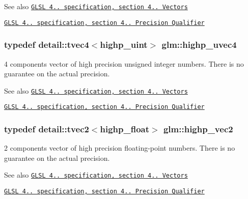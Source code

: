 \begin{DoxySeeAlso}{See also}
\href{http://www.opengl.org/registry/doc/GLSLangSpec.4.20.8.pdf}{\tt G\+L\+S\+L 4.. specification, section 4.. Vectors} 

\href{http://www.opengl.org/registry/doc/GLSLangSpec.4.20.8.pdf}{\tt G\+L\+S\+L 4.. specification, section 4.. Precision Qualifier} 
\end{DoxySeeAlso}
\hypertarget{group__core__precision_gadc25684638be5d1caeb63d3d5e55feec}{}
\subsubsection[{highp\+\_\+uvec4}]{\setlength{\rightskip}{0pt plus 5cm}typedef detail\+::tvec4$<$highp\+\_\+uint$>$ {\bf glm\+::highp\+\_\+uvec4}}\label{group__core__precision_gadc25684638be5d1caeb63d3d5e55feec}
4 components vector of high precision unsigned integer numbers. There is no guarantee on the actual precision.

\begin{DoxySeeAlso}{See also}
\href{http://www.opengl.org/registry/doc/GLSLangSpec.4.20.8.pdf}{\tt G\+L\+S\+L 4.. specification, section 4.. Vectors} 

\href{http://www.opengl.org/registry/doc/GLSLangSpec.4.20.8.pdf}{\tt G\+L\+S\+L 4.. specification, section 4.. Precision Qualifier} 
\end{DoxySeeAlso}
\hypertarget{group__core__precision_ga0747567a49e0fa00ecd05011c1645d69}{}
\subsubsection[{highp\+\_\+vec2}]{\setlength{\rightskip}{0pt plus 5cm}typedef detail\+::tvec2$<$highp\+\_\+float$>$ {\bf glm\+::highp\+\_\+vec2}}\label{group__core__precision_ga0747567a49e0fa00ecd05011c1645d69}
2 components vector of high precision floating-\/point numbers. There is no guarantee on the actual precision.

\begin{DoxySeeAlso}{See also}
\href{http://www.opengl.org/registry/doc/GLSLangSpec.4.20.8.pdf}{\tt G\+L\+S\+L 4.. specification, section 4.. Vectors} 

\href{http://www.opengl.org/registry/doc/GLSLangSpec.4.20.8.pdf}{\tt G\+L\+S\+L 4.. specification, section 4.. Precision Qualifier} 
\end{DoxySeeAlso}
\hypertarget{group__core__precision_gab660f8916a9c4a72bf71cd4279ae19fb}{}
